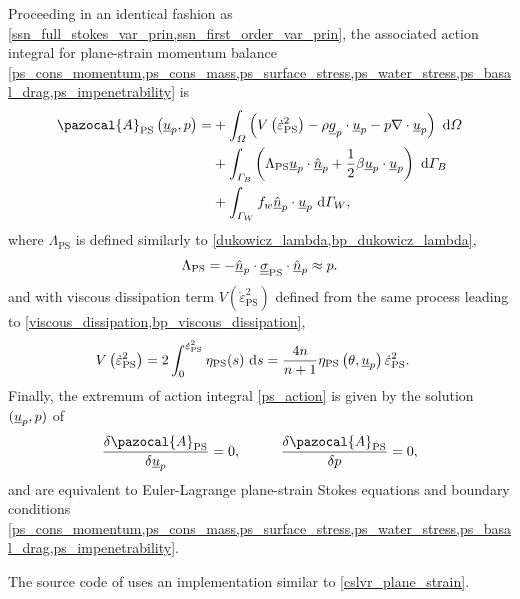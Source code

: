 Proceeding in an identical fashion as \cref{ssn_full_stokes_var_prin,ssn_first_order_var_prin}, the associated action integral for plane-strain momentum balance \cref{ps_cons_momentum,ps_cons_mass,ps_surface_stress,ps_water_stress,ps_basal_drag,ps_impenetrability} is
\begin{align}
  \label{ps_action}
  \pazocal{A}_{\text{PS}} \left(\rankone{u}_p, p\right) = &+ \int_{\Omega} \left( V\left( \dot{\varepsilon}_{\text{PS}}^2 \right) - \rho \rankone{g}_p \cdot \rankone{u}_p - p \nabla \cdot \rankone{u}_p \right) \d{\Omega} \notag \\
  &+ \int_{\Gamma_B} \left( \Lambda_{\text{PS}} \rankone{u}_p \cdot \normal_p + \frac{1}{2} \beta \rankone{u}_p \cdot \rankone{u}_p \right) \d{\Gamma_B} \notag \\
  &+ \int_{\Gamma_W} f_w \normal_p \cdot \rankone{u}_p \d{\Gamma_W},
\end{align}
where $\Lambda_{\text{PS}}$ is defined similarly to \cref{dukowicz_lambda,bp_dukowicz_lambda},
\begin{align}
  \label{ps_dukowicz_lambda}
  \Lambda_{\text{PS}} = - \underline{\hat{n}}_p \cdot \underline{\underline{\sigma}}_{\text{PS}} \cdot \underline{\hat{n}}_p \approx p.
\end{align}
and with viscous dissipation term $V\left( \dot{\varepsilon}_{\text{PS}}^2 \right)$ defined from the same process leading to \cref{viscous_dissipation,bp_viscous_dissipation}, 
\begin{align}
  \label{ps_viscous_dissipation}
  V\left( \dot{\varepsilon}_{\text{PS}}^2 \right) &= 2 \int_0^{\dot{\varepsilon}_{\text{PS}}^2} \eta_{\text{PS}}(s) \ \mathrm{d}s = \frac{4n}{n+1} \eta_{\text{PS}}\left(\theta, \underline{u}_p \right) \dot{\varepsilon}_{\text{PS}}^2.
\end{align}
Finally, the extremum of action integral \cref{ps_action} is given by the solution $(\underline{u}_p, p)$ of
\begin{align}
  \label{ps_extremum}
  \frac{\delta \pazocal{A}_{\text{PS}}}{\delta \rankone{u}_p} = 0, \hspace{10mm} \frac{\delta \pazocal{A}_{\text{PS}}}{\delta p} = 0,
\end{align}
and are equivalent to Euler-Lagrange plane-strain Stokes equations and boundary conditions \cref{ps_cons_momentum,ps_cons_mass,ps_surface_stress,ps_water_stress,ps_basal_drag,ps_impenetrability}.

The source code of \CSLVR uses an implementation similar to \cref{cslvr_plane_strain}.

